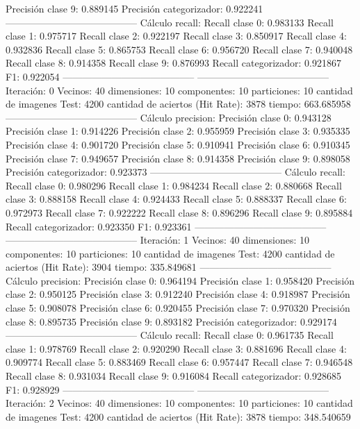 Precisión clase 9: 0.889145
Precisión categorizador: 0.922241
-----------------------------------------
Cálculo recall: 
Recall clase 0: 0.983133
Recall clase 1: 0.975717
Recall clase 2: 0.922197
Recall clase 3: 0.850917
Recall clase 4: 0.932836
Recall clase 5: 0.865753
Recall clase 6: 0.956720
Recall clase 7: 0.940048
Recall clase 8: 0.914358
Recall clase 9: 0.876993
Recall categorizador: 0.921867
F1: 0.922054
-----------------------------------------
-----------------------------------------
Iteración: 0
Vecinos: 40
dimensiones: 10
componentes: 10
particiones: 10
cantidad de imagenes Test: 4200
cantidad de aciertos (Hit Rate): 3878
tiempo: 663.685958
-----------------------------------------
Cálculo precision: 
Precisión clase 0: 0.943128
Precisión clase 1: 0.914226
Precisión clase 2: 0.955959
Precisión clase 3: 0.935335
Precisión clase 4: 0.901720
Precisión clase 5: 0.910941
Precisión clase 6: 0.910345
Precisión clase 7: 0.949657
Precisión clase 8: 0.914358
Precisión clase 9: 0.898058
Precisión categorizador: 0.923373
-----------------------------------------
Cálculo recall: 
Recall clase 0: 0.980296
Recall clase 1: 0.984234
Recall clase 2: 0.880668
Recall clase 3: 0.888158
Recall clase 4: 0.924433
Recall clase 5: 0.888337
Recall clase 6: 0.972973
Recall clase 7: 0.922222
Recall clase 8: 0.896296
Recall clase 9: 0.895884
Recall categorizador: 0.923350
F1: 0.923361
-----------------------------------------
-----------------------------------------
Iteración: 1
Vecinos: 40
dimensiones: 10
componentes: 10
particiones: 10
cantidad de imagenes Test: 4200
cantidad de aciertos (Hit Rate): 3904
tiempo: 335.849681
-----------------------------------------
Cálculo precision: 
Precisión clase 0: 0.964194
Precisión clase 1: 0.958420
Precisión clase 2: 0.950125
Precisión clase 3: 0.912240
Precisión clase 4: 0.918987
Precisión clase 5: 0.908078
Precisión clase 6: 0.920455
Precisión clase 7: 0.970320
Precisión clase 8: 0.895735
Precisión clase 9: 0.893182
Precisión categorizador: 0.929174
-----------------------------------------
Cálculo recall: 
Recall clase 0: 0.961735
Recall clase 1: 0.978769
Recall clase 2: 0.920290
Recall clase 3: 0.881696
Recall clase 4: 0.909774
Recall clase 5: 0.883469
Recall clase 6: 0.957447
Recall clase 7: 0.946548
Recall clase 8: 0.931034
Recall clase 9: 0.916084
Recall categorizador: 0.928685
F1: 0.928929
-----------------------------------------
-----------------------------------------
Iteración: 2
Vecinos: 40
dimensiones: 10
componentes: 10
particiones: 10
cantidad de imagenes Test: 4200
cantidad de aciertos (Hit Rate): 3878
tiempo: 348.540659
